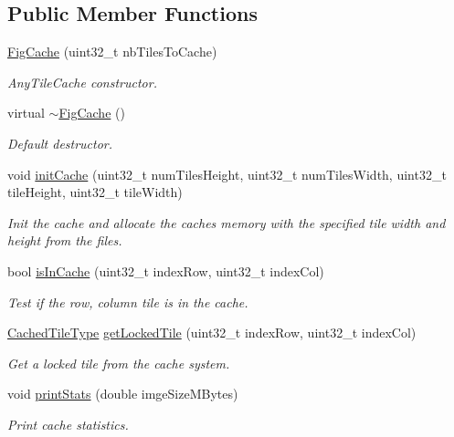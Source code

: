 \subsection*{Public Member Functions}
\begin{DoxyCompactItemize}
\item 
\hyperlink{classfi_1_1FigCache_a374d90ca00fbfb190ca48df105275aed}{Fig\+Cache} (uint32\+\_\+t nb\+Tiles\+To\+Cache)
\begin{DoxyCompactList}\small\item\em Any\+Tile\+Cache constructor. \end{DoxyCompactList}\item 
virtual \hyperlink{classfi_1_1FigCache_ad2b4ed889aecc7e9c8d332e85fc863a8}{$\sim$\+Fig\+Cache} ()
\begin{DoxyCompactList}\small\item\em Default destructor. \end{DoxyCompactList}\item 
void \hyperlink{classfi_1_1FigCache_a7e9e6784d3b4415d180cd6b24f7e1afa}{init\+Cache} (uint32\+\_\+t num\+Tiles\+Height, uint32\+\_\+t num\+Tiles\+Width, uint32\+\_\+t tile\+Height, uint32\+\_\+t tile\+Width)
\begin{DoxyCompactList}\small\item\em Init the cache and allocate the cache\textquotesingle{}s memory with the specified tile width and height from the files. \end{DoxyCompactList}\item 
bool \hyperlink{classfi_1_1FigCache_a4d4792d8a1d737b5b6baa261c1761751}{is\+In\+Cache} (uint32\+\_\+t index\+Row, uint32\+\_\+t index\+Col)
\begin{DoxyCompactList}\small\item\em Test if the row, column tile is in the cache. \end{DoxyCompactList}\item 
\hyperlink{classfi_1_1FigCache_a7b9bbc4a832c01c3a461f573445c3c41}{Cached\+Tile\+Type} \hyperlink{classfi_1_1FigCache_aff587e5ffcbeeab89a0ed4a0629231e3}{get\+Locked\+Tile} (uint32\+\_\+t index\+Row, uint32\+\_\+t index\+Col)
\begin{DoxyCompactList}\small\item\em Get a locked tile from the cache system. \end{DoxyCompactList}\item 
void \hyperlink{classfi_1_1FigCache_a52c827839da88476aecac16c7b65a18b}{print\+Stats} (double imge\+Size\+M\+Bytes)
\begin{DoxyCompactList}\small\item\em Print cache statistics. \end{DoxyCompactList}\item 

\end{DoxyCompactItemize}
